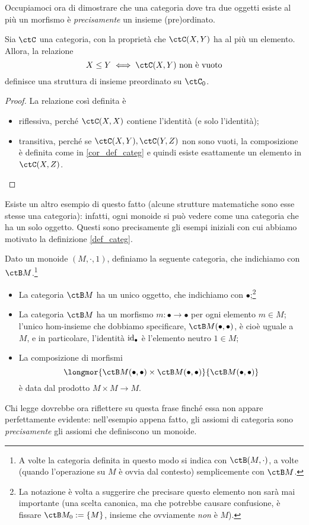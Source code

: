 Occupiamoci ora di dimostrare che una categoria dove tra due oggetti esiste al più un morfismo è \emph{precisamente} un insieme (pre)ordinato.
\begin{theorem}\label{cat_sonopos}
	Sia \(\ctC\) una categoria, con la proprietà che \(\ctC(X,Y)\) ha al più un elemento. Allora, la relazione
	\[X\le Y \iff \ctC(X,Y) \text{ non è vuoto}\]
	definisce una struttura di insieme preordinato su \(\ctC_0\).
\end{theorem}
\begin{proof}
	La relazione così definita è
	\begin{itemize}
		\item riflessiva, perché \(\ctC(X,X)\) contiene l'identità (e solo l'identità);
		\item transitiva, perché se \(\ctC(X,Y), \ctC(Y,Z)\) non sono vuoti, la composizione è definita come in \ref{cor_def_categ} e quindi esiste esattamente un elemento in \(\ctC(X,Z)\).\qedhere
	\end{itemize}
\end{proof}
Esiste un altro esempio di questo fatto (alcune strutture matematiche sono esse stesse una categoria): infatti, ogni monoide si può vedere come una categoria che ha un solo oggetto. Questi sono precisamente gli esempi iniziali con cui abbiamo motivato la definizione \ref{def_categ}.
\begin{theorem}\label{mon_sonocat}
	Dato un monoide \((M,\cdot,1)\), definiamo la seguente categoria, che indichiamo con \(\ctB M\).\footnote{A volte la categoria definita in questo modo si indica con \(\ctB(M,\cdot)\), a volte (quando l'operazione su \(M\) è ovvia dal contesto) semplicemente con \(\ctB M\).}
	\begin{itemize}
		\item La categoria \(\ctB M\) ha un unico oggetto, che indichiamo con \(\bullet\);\footnote{La notazione è volta a suggerire che precisare questo elemento non sarà mai importante (una scelta canonica, ma che potrebbe causare confusione, è fissare \(\ctB M_0 := \{M\}\), insieme che ovviamente \emph{non} è \(M\)).}
		\item La categoria \(\ctB M\) ha un morfismo \(m:\bullet\to\bullet\) per ogni elemento \(m\in M\); l'unico hom-insieme che dobbiamo specificare, \(\Hom{\ctB M}(\bullet,\bullet)\), è cioè uguale a \(M\), e in particolare, l'identità \(\mathrm{id}_\bullet\) è l'elemento neutro \(1\in M\);
		\item La composizione di morfismi
		      \[\longmor{\Hom{\ctB M}(\bullet,\bullet)\times \Hom{\ctB M}(\bullet,\bullet)}{\Hom{\ctB M}(\bullet,\bullet)}\]
		      è data dal prodotto \(M\times M\to M\).
	\end{itemize}
\end{theorem}
Chi legge dovrebbe ora riflettere su questa frase finché essa non appare perfettamente evidente: nell'esempio appena fatto, gli assiomi di categoria sono \emph{precisamente} gli assiomi che definiscono un monoide.

